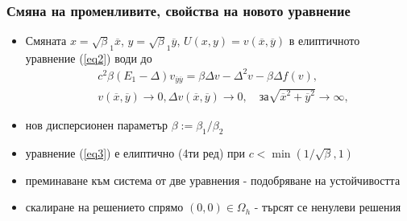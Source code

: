 \documentclass{beamer}
\newcommand{\rf}[1]{(\ref{#1})}
\begin{document}
\begin{frame}
\frametitle{Смяна на променливите, свойства на новото уравнение } 
 
\begin{itemize}
\item Смяната $x=\sqrt\beta_1 { \overline x}$, $y=\sqrt\beta_1 { \overline y}$, $U(x,y)= v({ \overline x},{ \overline y} )$ в елиптичното уравнение \rf{eq2} води до
 \begin{align}\label{eq3}
&c^2 \beta (E_1- \Delta) v_{{\overline y}{\overline y}} = \beta \Delta v - \Delta^2 v - \beta \Delta f(v), \\ 
&v(\overline x, \overline y) \rightarrow 0,  \Delta v(\overline x, \overline y) \rightarrow 0 ,  \quad \text{за}  \sqrt{\overline x^2 + \overline y^2} \rightarrow \infty, \nonumber
\end{align}
\end{itemize}
\begin{itemize}
  \item нов дисперсионен параметър $\beta := \beta_1/\beta_2$
  \item уравнение \rf{eq3} е елиптично (4ти ред) при $c < \min (1/ \sqrt{\beta},1)$
  \item преминаване към система от две уравнения - подобряване на устойчивостта
  \item скалиране на решението спрямо $(0,0) \in \Omega_h$ - търсят се ненулеви решения 
\end{itemize}

\end{frame}
\end{document}
